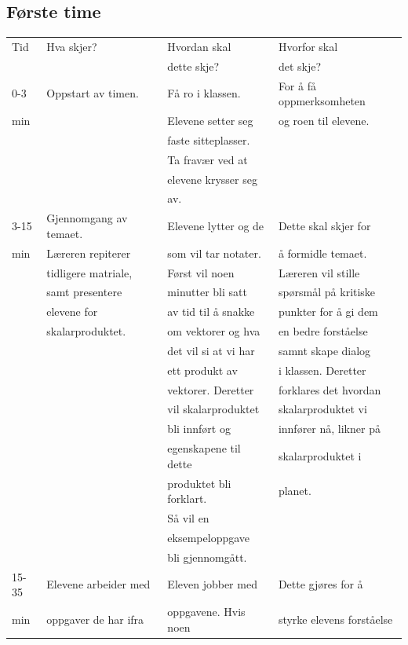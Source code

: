 \documentclass[11pt]{article}
\begin{document}
\subsection*{Første time}
\label{sec-2-1}
\begin{center}
\begin{tabular}{l|l|l|l}
Tid & Hva skjer? & Hvordan skal & Hvorfor skal\\
 &  & dette skje? & det skje?\\
\hline
0-3 & Oppstart av timen. & Få ro i klassen. & For å få oppmerksomheten\\
min &  & Elevene setter seg & og roen til elevene.\\
 &  & faste sitteplasser. & \\
 &  & Ta fravær ved at & \\
 &  & elevene krysser seg & \\
 &  & av. & \\
\hline
3-15 & Gjennomgang av temaet. & Elevene lytter og de & Dette skal skjer for\\
min & Læreren repiterer & som vil tar notater. & å formidle temaet.\\
 & tidligere matriale, & Først vil noen & Læreren vil stille\\
 & samt presentere & minutter bli satt & spørsmål på kritiske\\
 & elevene for & av tid til å snakke & punkter for å gi dem\\
 & skalarproduktet. & om vektorer og hva & en bedre forståelse\\
 &  & det vil si at vi har & samnt skape dialog\\
 &  & ett produkt av & i klassen. Deretter\\
 &  & vektorer. Deretter & forklares det hvordan\\
 &  & vil skalarproduktet & skalarproduktet vi\\
 &  & bli innført og & innfører nå, likner på\\
 &  & egenskapene til dette & skalarproduktet i\\
 &  & produktet bli forklart. & planet.\\
 &  & Så vil en & \\
 &  & eksempeloppgave & \\
 &  & bli gjennomgått. & \\
\hline
15-35 & Elevene arbeider med & Eleven jobber med & Dette gjøres for å\\
min & oppgaver de har ifra & oppgavene. Hvis noen & styrke elevens forståelse\\

\end{tabular}
\end{center}
\end{document}
